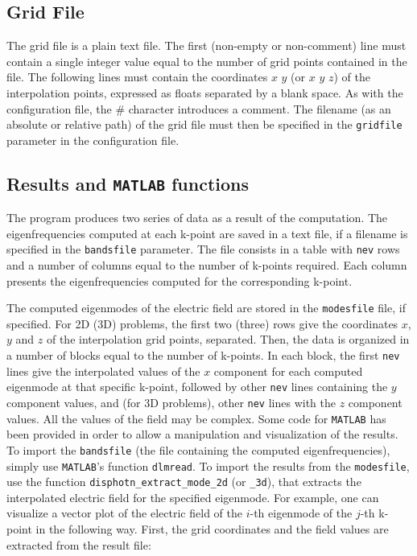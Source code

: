 \documentclass[11pt,a4paper,oneside]{article}
\begin{document}
\subsection{Grid File}
The grid file is a plain text file. The first (non-empty or non-comment) line must contain a single integer value equal to the number of grid points contained in the file. The following lines must contain the coordinates $x$ $y$ (or $x$ $y$ $z$) of the interpolation points, expressed as floats separated by a blank space. As with the configuration file, the \# character introduces a comment. The filename (as an absolute or relative path) of the grid file must then be specified in the {\tt gridfile} parameter in the configuration file.

\subsection{Results and {\tt MATLAB} functions}
The program produces two series of data as a result of the computation. The eigenfrequencies computed at each k-point are saved in a text file, if a filename is specified in the {\tt bandsfile} parameter. The file consists in a table with {\tt nev} rows and a number of columns equal to the number of k-points required. Each column presents the eigenfrequencies computed for the corresponding k-point.

The computed eigenmodes of the electric field are stored in the {\tt modesfile} file, if specified. For 2D (3D) problems, the first two (three) rows give the coordinates $x$, $y$ and $z$ of the interpolation grid points, separated. Then, the data is organized in a number of blocks equal to the number of k-points. In each block, the first {\tt nev} lines give the interpolated values of the $x$ component for each computed eigenmode at that specific k-point, followed by other {\tt nev} lines containing the $y$ component values, and (for 3D problems), other {\tt nev} lines with the $z$ component values. All the values of the field may be complex.
Some code for {\tt MATLAB} has been provided in order to allow a manipulation and visualization of the results. To import the {\tt bandsfile} (the file containing the computed eigenfrequencies), simply use {\tt MATLAB}'s function {\tt dlmread}. To import the results from the {\tt modesfile}, use the function {\tt disphotn\_extract\_mode\_2d} (or {\tt \_3d}), that extracts the interpolated electric field for the specified eigenmode. For example, one can visualize a vector plot of the electric field of the $i$-th eigenmode of the $j$-th k-point in the following way. First, the grid coordinates and the field values are extracted from the result file:
\end{document}
